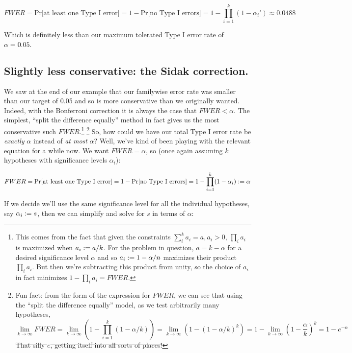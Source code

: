 \documentclass[../main/main.tex]{subfiles}
\begin{document}
\[FWER = \text{Pr[at least one Type I error]} = 
  1 - \text{Pr[no Type I errors]} = 1 - \prod_{i=1}^{k} (1 - \alpha_i') \approx 0.0488 \]

Which is definitely less than our maximum tolerated
Type I error rate of \(\alpha = 0.05\).

\subsection{Slightly less conservative: the Sidak correction.}

We saw at the end of our example that our familywise error rate
was smaller than our target of 0.05 and so is more conservative
than we originally wanted. Indeed, with the Bonferroni
correction it is always the case that \(FWER < \alpha\).
The simplest, ``split the difference equally'' method in fact
gives us the
most conservative such \(FWER\).\footnote
{
  This comes from the fact that given
  the constraints \(\sum_i^{k} a_i = a, a_i > 0\), 
  \(\prod_i a_i\) is maximized when \(a_i := a/k\).
  For the problem in question, \(a = k-\alpha\)
  for a desired significance level \(\alpha\) and so
  \(a_i := 1 - \alpha/n\) maximizes their product
  \(\prod_i a_i\).
  But then we're subtracting this product from unity,
  so the choice of \(a_i\) in fact minimizes
  \(1 - \prod_i a_i = FWER\).
}
\footnote
{
  Fun fact: from the form of the expression for \(FWER\),
  we can see that using the ``split the difference equally''
  model, as we test arbitrarily many hypotheses,
  \[
    \lim_{k \to \infty} FWER = 
    \lim_{k \to \infty} \left(1 - \prod_{i=1}^{k} (1 - \alpha/k)\right)
    = \lim_{k \to \infty} \left(1 - (1 - \alpha/k)^k\right)
    = 1 - \lim_{k \to \infty} \left(1 - \frac{\alpha}{k}\right)^{k}
    = 1 - e^{-\alpha}
  \]
  \sout{That silly \(e\), getting itself into all sorts of places!}
}
So, how could we have our total Type I error rate
be \emph{exactly} \(\alpha\) instead of \emph{at most}
\(\alpha\)?
Well, we've kind of been playing with the relevant
equation for a while now. We want \(FWER = \alpha\), so
(once again assuming \(k\) hypotheses with
significance levels \(\alpha_i\)):

\[
  FWER = \text{Pr[at least one Type I error]} = 
  1 - \text{Pr[no Type I errors]} = 1 - \prod_{i=1}^{k} (1 - \alpha_i) := \alpha
\]

If we decide we'll use the same significance level
for all the individual hypotheses, 
say \(\alpha_i := s\), then we can simplify
and solve for \(s\) in terms of \(\alpha\):
\end{document}
